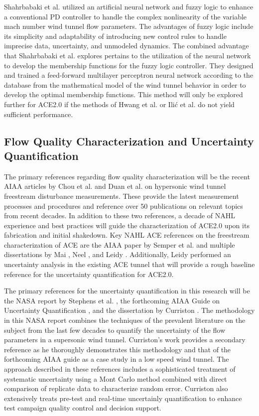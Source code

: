 Shahrbabaki et al. \cite{shahrbabaki-1} utilized an artificial neural network and fuzzy logic to enhance a conventional PD controller to handle the complex nonlinearity of the variable mach number wind tunnel flow parameters. The advantages of fuzzy logic include its simplicity and adaptability of introducing new control rules to handle imprecise data, uncertainty, and unmodeled dynamics. The combined advantage that Shahrbabaki et al. explores pertains to the utilization of the neural network to develop the membership functions for the fuzzy logic controller. They designed and trained a feed-forward multilayer perceptron neural network according to the database from the mathematical model of the wind tunnel behavior in order to develop the optimal membership functions. This method will only be explored further for ACE2.0 if the methods of Hwang et al. or Ili\'c et al. do not yield sufficient performance.

\subsection{Flow Quality Characterization and Uncertainty Quantification}
The primary references regarding flow quality characterization will be the recent AIAA articles by Chou et al. \cite{chou} and Duan et al. \cite{duan} on hypersonic wind tunnel freestream disturbance measurements. These provide the latest measurement processes and procedures and reference over 50 publications on relevant topics from recent decades. In addition to these two references, a decade of NAHL experience and best practices will guide the characterization of ACE2.0 upon its fabrication and initial shakedown. Key NAHL ACE references on the freestream characterization of ACE are the AIAA paper by Semper et al. \cite{aceturb} and multiple dissertations by Mai \cite{mai-dis}, Neel \cite{neel-dis}, and Leidy \cite{leidy-dis}. Additionally, Leidy performed an uncertainty analysis in the existing ACE tunnel that will provide a rough baseline reference for the uncertainty quantification for ACE2.0.

The primary references for the uncertainty quantification in this research will be the NASA report by Stephens et al. \cite{stephens-hubbard}, the forthcoming AIAA Guide on Uncertainty Quantification \cite{uq-aiaa}, and the dissertation by Curriston \cite{curriston-dis}. The methodology in this NASA report combines the techniques of the prevalent literature on the subject from the last few decades to quantify the uncertainty of the flow parameters in a supersonic wind tunnel. Curriston's work provides a secondary reference as he thoroughly demonstrates this methodology and that of the forthcoming AIAA guide as a case study in a low speed wind tunnel. The approach described in these references includes a sophisticated treatment of systematic uncertainty using a Mont Carlo method combined with direct comparison of replicate data to characterize random error. Curriston \cite{curriston-dis} also extensively treats pre-test and real-time uncertainly quantification to enhance test campaign quality control and decision support.

